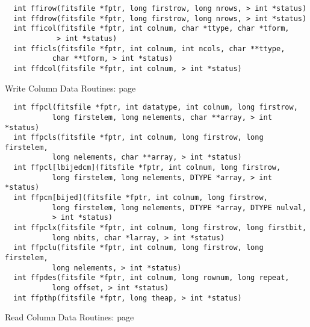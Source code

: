 \begin{verbatim}
  int ffirow(fitsfile *fptr, long firstrow, long nrows, > int *status)
  int ffdrow(fitsfile *fptr, long firstrow, long nrows, > int *status)
  int fficol(fitsfile *fptr, int colnum, char *ttype, char *tform,
            > int *status)
  int fficls(fitsfile *fptr, int colnum, int ncols, char **ttype,
           char **tform, > int *status)
  int ffdcol(fitsfile *fptr, int colnum, > int *status)
\end{verbatim}
 Write Column Data Routines: page~\pageref{FFPCLS}

\begin{verbatim}
  int ffpcl(fitsfile *fptr, int datatype, int colnum, long firstrow,
           long firstelem, long nelements, char **array, > int *status)
  int ffpcls(fitsfile *fptr, int colnum, long firstrow, long firstelem,
           long nelements, char **array, > int *status)
  int ffpcl[lbijedcm](fitsfile *fptr, int colnum, long firstrow,
           long firstelem, long nelements, DTYPE *array, > int *status)
  int ffpcn[bijed](fitsfile *fptr, int colnum, long firstrow,
           long firstelem, long nelements, DTYPE *array, DTYPE nulval,
           > int *status)
  int ffpclx(fitsfile *fptr, int colnum, long firstrow, long firstbit,
           long nbits, char *larray, > int *status)
  int ffpclu(fitsfile *fptr, int colnum, long firstrow, long firstelem,
           long nelements, > int *status)
  int ffpdes(fitsfile *fptr, int colnum, long rownum, long repeat,
           long offset, > int *status)
  int ffpthp(fitsfile *fptr, long theap, > int *status)
\end{verbatim}
 Read Column Data Routines: page~\pageref{FFGCL}

